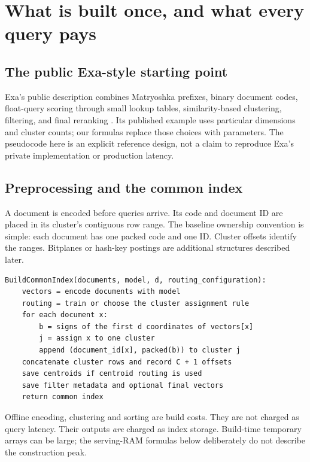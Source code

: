 \section{What is built once, and what every query pays}
\label{sec:shared}
\subsection{The public Exa-style starting point}
Exa's public description combines Matryoshka prefixes, binary document codes, float-query
scoring through small lookup tables, similarity-based clustering, filtering, and final
reranking \cite{exa}. Its published example uses particular dimensions and cluster counts;
our formulas replace those choices with parameters. The pseudocode here is an explicit
reference design, not a claim to reproduce Exa's private implementation or production latency.

\subsection{Preprocessing and the common index}
A document is encoded before queries arrive. Its code and document ID are placed in its
cluster's contiguous row range. The baseline ownership convention is simple: each document
has one packed code and one ID. Cluster offsets identify the ranges. Bitplanes or hash-key
postings are additional structures described later.

\par\noindent\begin{minipage}{\linewidth}
\begin{lstlisting}[caption={Common preprocessing; executed before serving queries.}]
BuildCommonIndex(documents, model, d, routing_configuration):
    vectors = encode documents with model
    routing = train or choose the cluster assignment rule
    for each document x:
        b = signs of the first d coordinates of vectors[x]
        j = assign x to one cluster
        append (document_id[x], packed(b)) to cluster j
    concatenate cluster rows and record C + 1 offsets
    save centroids if centroid routing is used
    save filter metadata and optional final vectors
    return common index
\end{lstlisting}
\end{minipage}\par

Offline encoding, clustering and sorting are build costs. They are not charged as query
latency. Their outputs \emph{are} charged as index storage. Build-time temporary arrays can be
large; the serving-RAM formulas below deliberately do not describe the construction peak.

